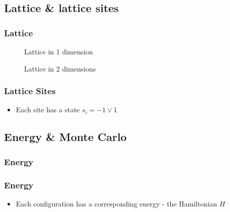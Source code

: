 \documentclass{beamer}
\newcommand{\tikzfigC}[2]{\begin{figure}[h]\begin{center}\end{center}\caption{{#2}}\end{figure}}
\begin{document}
\subsection{Lattice \& lattice sites}

\begin{frame}\frametitle{Lattice}
\tikzfigC{Ising1D}{Lattice in 1 dimension}
\vspace*{0.25cm}
\tikzfigC{Ising2D}{Lattice in 2 dimensions}

\end{frame}


\begin{frame}\frametitle{Lattice Sites}
\begin{itemize}
\item Each site has a state $s_i = -1\lor1$
\end{itemize}
\end{frame}




\subsection{Energy \& Monte Carlo}
\subsubsection{Energy}
\begin{frame}\frametitle{Energy}
\begin{itemize}
\item Each configuration has a corresponding energy - the Hamiltonian $H$
\end{itemize}
\end{frame}
\end{document}
